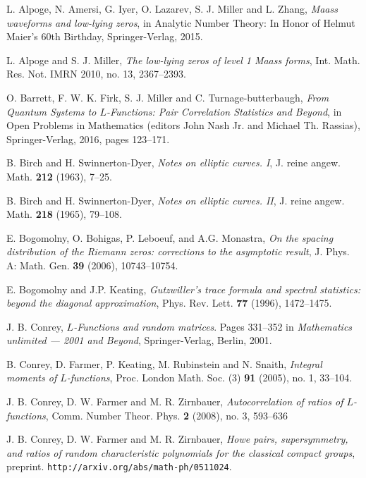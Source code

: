 \documentclass[12pt, reqno]{amsart}
\numberwithin{equation}{section}
\theoremstyle{definition}
\theoremstyle{remark}
\begin{document}
\begin{thebibliography}{FMGGGG15}

L. Alpoge, N. Amersi, G. Iyer, O. Lazarev, S. J. Miller and L. Zhang, \emph{Maass waveforms and low-lying zeros}, in Analytic Number Theory: In Honor of Helmut Maier's 60th Birthday, Springer-Verlag, 2015.

L. Alpoge and S. J. Miller, \emph{The low-lying zeros of level 1 Maass forms}, Int. Math. Res. Not. IMRN 2010, no. 13, 2367--2393.

O. Barrett, F. W. K. Firk, S. J. Miller and C. Turnage-butterbaugh, \emph{From Quantum Systems to $L$-Functions: Pair Correlation Statistics and Beyond}, in Open Problems in Mathematics (editors John Nash  Jr. and Michael Th. Rassias), Springer-Verlag, 2016, pages 123--171.

\newblock B. Birch and H. Swinnerton-Dyer, \emph{Notes on elliptic
curves. I}, J. reine angew. Math. \textbf{212} (1963), 7--25.

\newblock B. Birch and H. Swinnerton-Dyer, \emph{Notes on elliptic
curves. II}, J. reine angew. Math. \textbf{218} (1965), 79--108.

  E. Bogomolny, O. Bohigas, P. Leboeuf, and A.G. Monastra,
  \emph{On the spacing distribution of the Riemann zeros: corrections to the asymptotic result}, J. Phys. A: Math. Gen. \textbf{39} (2006), 10743--10754.

  E. Bogomolny and J.P. Keating, \emph{Gutzwiller's trace formula and spectral statistics: beyond the diagonal approximation}, Phys. Rev. Lett. \textbf{77} (1996), 1472--1475.

J. B. Conrey, \emph{$L$-Functions and random matrices}. Pages
331--352 in \emph{Mathematics unlimited --- 2001 and Beyond},
Springer-Verlag, Berlin, 2001.

\newblock B. Conrey, D. Farmer, P. Keating, M. Rubinstein and N.
Snaith, \emph{Integral moments of $L$-functions}, Proc. London Math.
Soc. (3)  \textbf{91} (2005),  no. 1, 33--104.

\newblock J. B. Conrey, D. W. Farmer and M. R. Zirnbauer, \emph{Autocorrelation of ratios
of $L$-functions}, Comm. Number Theor. Phys. \textbf{2} (2008), no. 3, 593--636

\newblock J. B. Conrey, D. W. Farmer and M. R. Zirnbauer, \emph{Howe pairs, supersymmetry,
and ratios of random characteristic polynomials for the classical
compact groups}, preprint. \texttt{http://arxiv.org/abs/math-ph/0511024}.


\end{thebibliography}
\end{document}

